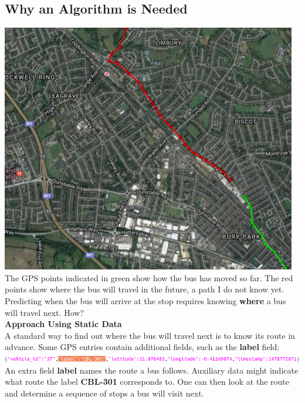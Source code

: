 \documentclass[12pt,a4paper,oneside,openright]{report}
\begin{document}
\subsection{Why an Algorithm is Needed}

\includegraphics[scale=0.8]{figs/route_detector.png} \\

The GPS points indicated in green show how the bus has moved so far.
The red points show where the bus will travel in the future,
a path I do not know yet. Predicting when the bus will arrive at the stop
requires knowing \textbf{where} a bus will travel next. How? \\

\textbf{Approach Using Static Data} \\

A standard way to find out where the bus will travel next is to know its 
route in advance. Some GPS entries contain additional fields,
such as the \textbf{label} field: \\

\includegraphics[width=\textwidth, scale=1.2]{figs/labelled_entry.png} \\

An extra field \textbf{label} names the route a bus follows. Auxiliary
data might indicate what route the label \textbf{CBL-301} corresponds to.
One can then look at the route and determine a sequence of stops 
a bus will visit next. \\
\end{document}
